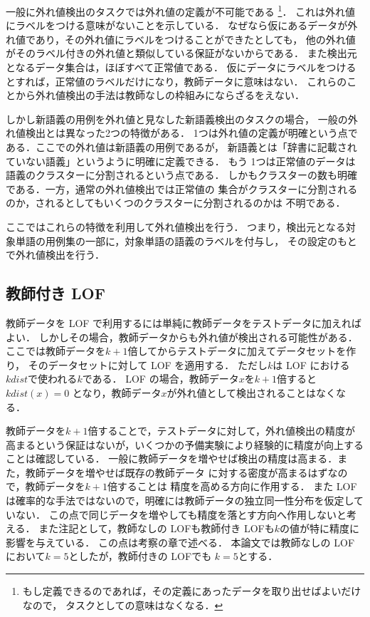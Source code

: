 \documentclass[japanese]{jnlp_1.4}
\begin{document}
一般に外れ値検出のタスクでは外れ値の定義が不可能である
\footnote{もし定義できるのであれば，その定義にあったデータを取り出せばよいだけなので，
タスクとしての意味はなくなる．}．
これは外れ値にラベルをつける意味がないことを示している．
なぜなら仮にあるデータが外れ値であり，その外れ値にラベルをつけることができたとしても，
他の外れ値がそのラベル付きの外れ値と類似している保証がないからである．
また検出元となるデータ集合は，ほぼすべて正常値である．
仮にデータにラベルをつけるとすれば，正常値のラベルだけになり，教師データに意味はない．
これらのことから外れ値検出の手法は教師なしの枠組みにならざるをえない．

しかし新語義の用例を外れ値と見なした新語義検出のタスクの場合，
一般の外れ値検出とは異なった2つの特徴がある．
1つは外れ値の定義が明確という点である．ここでの外れ値は新語義の用例であるが，
新語義とは「辞書に記載されていない語義」というように明確に定義できる．
もう 1つは正常値のデータは語義のクラスターに分割されるという点である．
しかもクラスターの数も明確である．一方，通常の外れ値検出では正常値の
集合がクラスターに分割されるのか，されるとしてもいくつのクラスターに分割されるのかは
不明である．

ここではこれらの特徴を利用して外れ値検出を行う．
つまり，検出元となる対象単語の用例集の一部に，対象単語の語義のラベルを付与し，
その設定のもとで外れ値検出を行う．


\subsection{教師付き LOF}

教師データを LOF で利用するには単純に教師データをテストデータに加えればよい．
しかしその場合，教師データからも外れ値が検出される可能性がある．
ここでは教師データを\( k + 1 \)倍してからテストデータに加えてデータセットを作り，
そのデータセットに対して LOF を適用する．
ただし\( k \)は LOF における\( kdist \)で使われる\( k \)である．
LOF の場合，教師データ\( x \)を\( k + 1 \)倍すると\( kdist(x) = 0 \)
となり，教師データ\( x \)が外れ値として検出されることはなくなる．

教師データを\( k + 1 \)倍することで，テストデータに対して，外れ値検出の精度が
高まるという保証はないが，いくつかの予備実験により経験的に精度が向上することは確認している．
一般に教師データを増やせば検出の精度は高まる．また，教師データを増やせば既存の教師データ
に対する密度が高まるはずなので，教師データを\( k + 1 \)倍することは
精度を高める方向に作用する．
また LOF は確率的な手法ではないので，明確には教師データの独立同一性分布を仮定していない．
この点で同じデータを増やしても精度を落とす方向へ作用しないと考える．
また注記として，教師なしの LOFも教師付き LOFも\( k \)の値が特に精度に影響を与えている．
この点は考察の章で述べる．
本論文では教師なしの LOF において\( k = 5 \)としたが，教師付きの LOFでも
\( k = 5\)とする．
\end{document}
